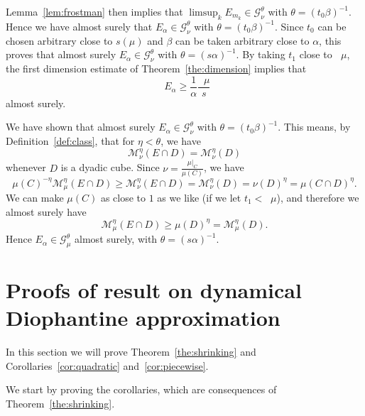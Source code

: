 \documentclass[10pt]{amsart}
\theoremstyle{definition}\newtheorem{defi}[theo]{Definition}\newtheorem{rema}[theo]{Remark}\newtheorem{exam}[theo]{Example}\newtheorem{exem}[theo]{Example}\newtheorem{nota}[theo]{Notation}
\DeclareMathOperator{\dimh}{dim_H}
\DeclareMathOperator{\ldimh}{\underline{dim}_H}
\DeclareMathOperator{\udimh}{\overline{dim}_H}
\begin{document}
Lemma~\ref{lem:frostman} then implies that $\limsup_k E_{m_k} \in
\mathscr{G}_\nu^\theta$ with $\theta = (t_0 \beta)^{-1}$. Hence we have almost surely that $E_\alpha \in \mathscr{G}_\nu^\theta$ with $\theta = (t_0 \beta)^{-1}$. Since $t_0$ can be chosen arbitrary close to $s (\mu)$ and $\beta$ can be taken arbitrary close to $\alpha$, this proves that almost surely $E_\alpha \in
\mathscr{G}_\nu^\theta$ with $\theta = (s \alpha)^{-1}$. By taking $t_1$ close to $\udimh \mu$, the first dimension estimate of Theorem~\ref{the:dimension} implies that
\[
\dimh E_\alpha \geq \frac{1}{\alpha} \frac{\udimh \mu}{s}
\]
almost surely.

We have shown that almost surely $E_\alpha \in \mathscr{G}_\nu^\theta$ with $\theta = (t_0 \beta)^{-1}$. This means, by Definition~\ref{def:class}, that for $\eta < \theta$, we have
\[
\mathscr{M}_\nu^\eta (E \cap D) = \mathscr{M}_\nu^\eta (D)
\]
whenever $D$ is a dyadic cube. Since $\nu = \frac{\mu|_C}{\mu(C)}$, we have
\[
\mu (C)^{-\eta} \mathscr{M}_\mu^\eta (E \cap D) \geq \mathscr{M}_\nu^\eta (E \cap D) = \mathscr{M}_\nu^\eta (D) = \nu (D)^\eta = \mu(C \cap D)^\eta.
\]
We can make $\mu(C)$ as close to $1$ as we like (if we let $t_1 <
\ldimh \mu$), and therefore we almost surely have
\[
\mathscr{M}_\mu^\eta (E \cap D) \geq \mu(D)^\eta =
\mathscr{M}_\mu^\eta (D).
\]
Hence $E_\alpha \in \mathscr{G}_\mu^\theta$ almost surely, with $\theta = (s \alpha)^{-1}$.



\section{Proofs of result on dynamical Diophantine approximation} \label{sec:shrinkingproofs}

In this section we will prove Theorem~\ref{the:shrinking} and Corollaries~\ref{cor:quadratic} and~\ref{cor:piecewise}.

We start by proving the corollaries, which are consequences of Theorem~\ref{the:shrinking}.
\end{document}
